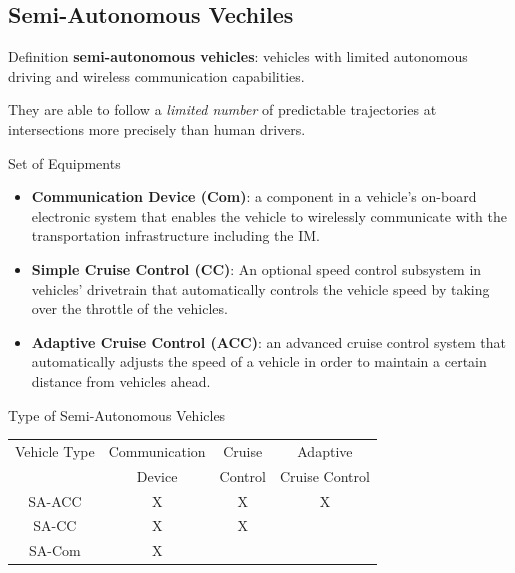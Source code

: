 \documentclass{beamer}
\begin{document}
\subsection{Semi-Autonomous Vechiles}

\begin{frame}{Definition}
\textbf{semi-autonomous vehicles}: vehicles with limited autonomous
driving and wireless communication capabilities.

\hfill

They are able to follow a \textit{limited number} of predictable
trajectories at intersections more precisely than human drivers.
\end{frame}

\begin{frame}{Set of Equipments}
\begin{itemize}
\item \textbf{Communication Device (Com)}:
a component in a vehicle's on-board electronic system that enables the
vehicle to wirelessly communicate with the transportation
infrastructure including the IM.
\item \textbf{Simple Cruise Control (CC)}:
An optional speed control subsystem in vehicles' drivetrain that
automatically controls the vehicle speed by taking over the throttle
of the vehicles. 
\item \textbf{Adaptive Cruise Control (ACC)}:
an advanced cruise control system that automatically adjusts the speed
of a vehicle in order to maintain a certain distance from vehicles
ahead.
\end{itemize}

\end{frame}

\begin{frame}{Type of Semi-Autonomous Vehicles}
\begin{tabular}{|c|c|c|c|}
  \hline
  Vehicle Type & Communication & Cruise & Adaptive \\
               & Device & Control & Cruise Control \\
  \hline
  SA-ACC & X & X & X  \\
  \hline
  SA-CC & X & X &  \\
  \hline
  SA-Com & X & &  \\
  \hline
\end{tabular}
\end{frame}
\end{document}
